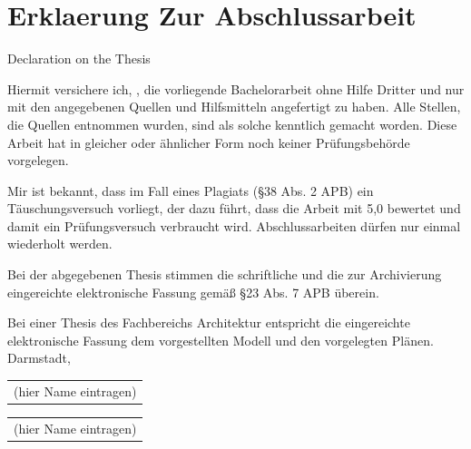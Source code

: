 \chapter*{Erklaerung Zur Abschlussarbeit}

Declaration on the Thesis

\sffamily
Hiermit versichere ich, \authors , die vorliegende Bachelorarbeit ohne Hilfe Dritter und nur mit
den angegebenen Quellen und Hilfsmitteln angefertigt zu haben. Alle Stellen, die Quellen entnommen
wurden, sind als solche kenntlich gemacht worden. Diese Arbeit hat in gleicher oder ähnlicher Form
noch keiner Prüfungsbehörde vorgelegen.

Mir ist bekannt, dass im Fall eines Plagiats (§38 Abs. 2 APB) ein Täuschungsversuch vorliegt, der dazu
führt, dass die Arbeit mit 5,0 bewertet und damit ein Prüfungsversuch verbraucht wird. Abschlussarbeiten
dürfen nur einmal wiederholt werden.

Bei der abgegebenen Thesis stimmen die schriftliche und die zur Archivierung eingereichte elektronische
Fassung gemäß §23 Abs. 7 APB überein.

Bei einer Thesis des Fachbereichs Architektur entspricht die eingereichte elektronische Fassung dem
vorgestellten Modell und den vorgelegten Plänen.\\

Darmstadt, \dateOfSubmission
\vspace{1.5cm}



\begin{tabular}{p{8cm}}\hline
\small{(hier Name eintragen)} 
\end{tabular}
\vspace{1.5cm}

\begin{tabular}{p{8cm}}\hline
\small{(hier Name eintragen)} 
\end{tabular}

\normalfont